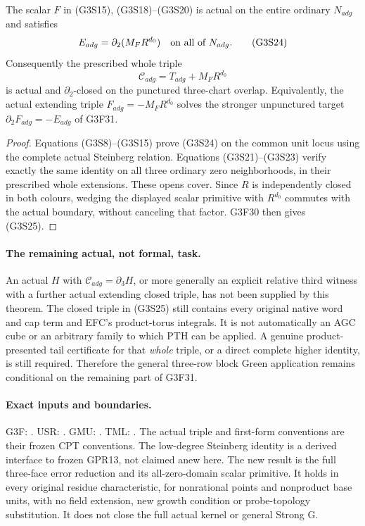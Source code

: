 \begin{theorem}
The scalar $F$ in (G3S15), (G3S18)--(G3S20) is actual on the entire
ordinary $N_{adg}$ and satisfies
\[
          E_{adg}=\partial_2(M_F R^{d_0})
                      \quad\hbox{on all of }N_{adg}.
 \tag{G3S24}
\]
Consequently the prescribed whole triple
\[
           \mathcal C_{adg}=T_{adg}+M_FR^{d_0}
 \tag{G3S25}
\]
is actual and $\partial_2$-closed on the punctured three-chart
overlap.  Equivalently, the actual extending triple
$F_{adg}=-M_FR^{d_0}$ solves the stronger unpunctured target
$\partial_2F_{adg}=-E_{adg}$ of G3F31.
\end{theorem}

\begin{proof}
Equations (G3S8)--(G3S15) prove (G3S24) on the common unit locus
using the complete actual Steinberg relation.  Equations
(G3S21)--(G3S23) verify exactly the same identity on all three
ordinary zero neighborhoods, in their prescribed whole extensions.
These opens cover.  Since $R$ is independently closed in both
colours, wedging the displayed scalar primitive with $R^{d_0}$
commutes with the actual boundary, without canceling that factor.
G3F30 then gives (G3S25).
\end{proof}

\paragraph{The remaining actual, not formal, task.}
An actual $H$ with $\mathcal C_{adg}=\partial_3H$, or more
generally an explicit relative third witness with a further actual
extending closed triple, has not been supplied by this theorem.
The closed triple in (G3S25) still contains every original native
word and cap term and EFC's product-torus integrals.  It is not
automatically an AGC cube or an arbitrary family to which PTH can
be applied.  A genuine product-presented tail certificate for that
\emph{whole} triple, or a direct complete higher identity, is still
required.  Therefore the general three-row block Green application
remains conditional on the remaining part of G3F31.

\paragraph{Exact inputs and boundaries.}
G3F: .
USR: .
GMU: .
TML: .
The actual triple and first-form conventions are their frozen CPT
conventions.  The low-degree Steinberg identity is a derived
interface to frozen GPR13, not claimed anew here.  The new result
is the full three-face error reduction and its all-zero-domain
scalar primitive.  It holds in every original residue
characteristic, for nonrational points and nonproduct base units,
with no field extension, new growth condition or probe-topology
substitution.  It does not close the full actual kernel or general
Strong G.
